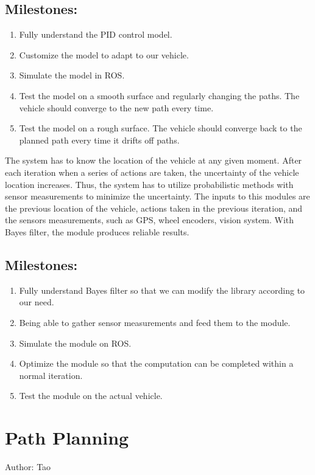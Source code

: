 \documentclass[compsoc,draftclsnofoot,onecolumn,10pt]{IEEEtran}
\begin{document}
\subsection{Milestones:}
\begin{enumerate}
	\item Fully understand the PID control model.
	\item Customize the model to adapt to our vehicle.
	\item Simulate the model in ROS.
	\item Test the model on a smooth surface and regularly changing the paths. The vehicle should converge to the new path every time.
	\item Test the model on a rough surface. The vehicle should converge back to the planned path every time it drifts off paths.
\end{enumerate}

The system has to know the location of the vehicle at any given moment. After each iteration when a series of actions are taken, the uncertainty of the vehicle location increases. Thus, the system has to utilize probabilistic methods with sensor measurements to minimize the uncertainty. The inputs to this modules are the previous location of the vehicle, actions taken in the previous iteration, and the sensors measurements, such as GPS, wheel encoders, vision system. With Bayes filter, the module produces reliable results.\par
\subsection{Milestones:}
\begin{enumerate}
	\item Fully understand Bayes filter so that we can modify the library according to our need.
	\item Being able to gather sensor measurements and feed them to the module.
	\item Simulate the module on ROS.
	\item Optimize the module so that the computation can be completed within a normal iteration.
	\item Test the module on the actual vehicle.
\end{enumerate}

\section{Path Planning}
Author: Tao \par
\end{document}
